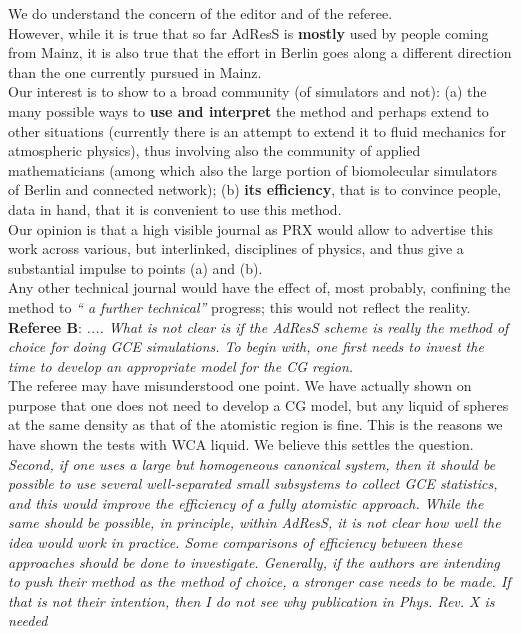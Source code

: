 \documentclass[12pt]{article}
\begin{document}
We do understand the concern of the editor and of the referee.\\
However, while it is true that so far AdResS is {\bf mostly} used by people coming from Mainz,
it is also true that the effort in Berlin goes along a different direction than the one currently pursued 
in Mainz.\\
Our interest is to show to a broad community (of simulators and not): (a) the many possible ways to {\bf use and interpret} the method and perhaps extend to other situations (currently there is an attempt to extend it to fluid mechanics for atmospheric physics), thus involving also the community of applied mathematicians (among which also the large portion of biomolecular simulators of Berlin and connected network);
(b) {\bf its efficiency}, that is to convince people, data in hand, that it is convenient to use this method.\\
Our opinion is that a high visible journal as PRX would allow to advertise this work across various, but interlinked, disciplines of physics, and thus give a substantial impulse to points (a) and (b).\\
Any other technical journal would have the effect of, most probably, confining the method to {\it `` a further technical''} progress; this would not reflect the reality.\\


{\bf Referee B}:
{\color{red} {\it.... What is not
clear is if the AdResS scheme is really the method of choice for doing GCE simulations. To begin with,
one first needs to invest the time to develop an appropriate model for the CG region.}}\\

The referee may have misunderstood one point. We have actually shown on purpose that one does not need to develop a CG model, but any liquid of spheres at the same density as that of the atomistic region is fine.
This is the reasons we have shown the tests with WCA liquid. We believe this settles the question.\\

{\color{red} {\it Second, if one uses
a large but homogeneous canonical system, then it should be possible to use several well-separated small
subsystems to collect GCE statistics, and this would improve the efficiency of a fully atomistic approach.
While the same should be possible, in principle, within AdResS, it is not clear how well the idea would
work in practice. Some comparisons of efficiency between these approaches should be done to investigate.
Generally, if the authors are intending to push their method as the method of choice, a stronger case
needs to be made. If that is not their intention, then I do not see why publication in Phys. Rev. X is
needed}}\\
\end{document}

